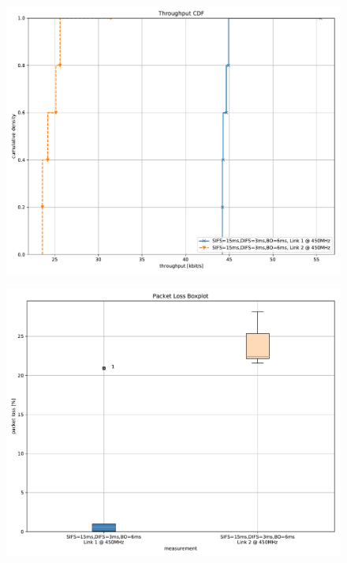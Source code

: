 \documentclass{article}
\begin{document}
\begin{figure}
	\includegraphics[width=\textwidth]{rb_high_dual/cdf/throughput_cdf}
\end{figure}

\begin{figure}
	\includegraphics[width=\textwidth]{rb_high_dual/boxplot/packet_loss_boxplot}
\end{figure}
\end{document}
